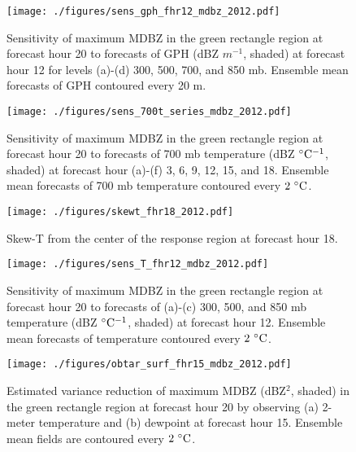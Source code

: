 \documentclass{ttuthes2007}
\begin{document}
\begin{figure}[!tb]
  \centering
  \noindent\texttt{[image: ./figures/sens\_gph\_fhr12\_mdbz\_2012.pdf]}\\
  \caption{Sensitivity of maximum MDBZ in the green rectangle region at forecast hour 20 to forecasts of GPH (dBZ $m^{-1}$, shaded) at forecast hour 12 for levels (a)-(d) 300, 500, 700, and 850 mb. Ensemble mean forecasts of GPH contoured every 20 m.}
\label{sens_gph_fhr12_mdbz_2012}
\end{figure}

\begin{figure}[!tb]
  \centering
  \noindent\texttt{[image: ./figures/sens\_700t\_series\_mdbz\_2012.pdf]}\\
  \caption{Sensitivity of maximum MDBZ in the green rectangle region at forecast hour 20 to forecasts of 700 mb temperature (dBZ ${}^{\circ} {\rm C^{-1}}$, shaded) at forecast hour (a)-(f) 3, 6, 9, 12, 15, and 18. Ensemble mean forecasts of 700 mb temperature contoured every $2^{~\circ} {\rm C}$. }
\label{sens_700t_series_mdbz_2012}
\end{figure}

\begin{figure}[!tb]
  \centering
  \noindent\texttt{[image: ./figures/skewt\_fhr18\_2012.pdf]}\\
  \caption{Skew-T from the center of the response region at forecast hour 18.}
\label{skewt_2012}
\end{figure}

\begin{figure}[!tb]
  \centering
  \noindent\texttt{[image: ./figures/sens\_T\_fhr12\_mdbz\_2012.pdf]}\\
  \caption{Sensitivity of maximum MDBZ in the green rectangle region at forecast hour 20 to forecasts of (a)-(c) 300, 500, and 850 mb temperature (dBZ ${}^{\circ} {\rm C^{-1}}$, shaded) at forecast hour 12. Ensemble mean forecasts of temperature contoured every $2^{~\circ} {\rm C}$. }
\label{sens_T_fhr12_mdbz_2012}
\end{figure}

\begin{figure}[!tb]
  \centering
  \noindent\texttt{[image: ./figures/obtar\_surf\_fhr15\_mdbz\_2012.pdf]}\\
  \caption{Estimated variance reduction of maximum MDBZ (dBZ${}^2$, shaded) in the green rectangle region at forecast hour 20 by observing (a) 2-meter temperature and (b) dewpoint at forecast hour 15. Ensemble mean fields are contoured every $2^{~\circ} {\rm C}$.}
\label{obtar_surf_fhr15_mdbz_2012}
\end{figure}
\end{document}
